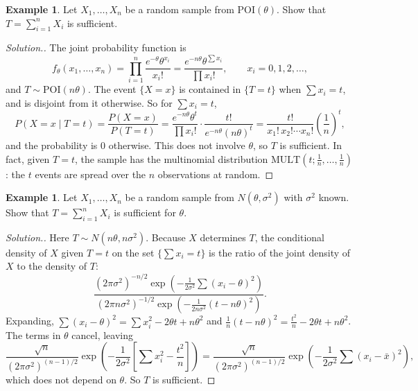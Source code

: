 \documentclass[12pt,a4paper]{report}
\theoremstyle{definition}
\newtheorem{exa}[thm]{Example}
\newenvironment{solution}
  {\renewcommand{\qedsymbol}{}\begin{proof}[\textit{Solution}.]}
  {\end{proof}}
\begin{document}
\begin{exa}
\label{ex:poissonsufficient}
Let $X_1, \dots, X_n$ be a random sample from $\text{POI}(\theta)$. Show that
$T = \sum_{i=1}^n X_i$ is sufficient.
\end{exa}

\begin{solution}
The joint probability function is
\[f_\theta(x_1, \dots, x_n) = \prod^n_{i = 1}\frac{e^{-\theta}\theta^{x_i}}{x_i!}
= \frac{e^{-n\theta}\theta^{\sum x_i}}{\prod x_i!},\qquad x_i = 0, 1, 2, \dots ,\]
and $T\sim\text{POI}(n\theta)$. The event $\{X = x\}$ is contained in
$\{T = t\}$ when $\sum x_i = t$, and is disjoint from it otherwise. So for
$\sum x_i = t$,
\[P(X = x\mid T = t) = \frac{P(X = x)}{P(T = t)}
= \frac{e^{-n\theta}\theta^{t}}{\prod x_i!}\cdot\frac{t!}{e^{-n\theta}(n\theta)^t}
= \frac{t!}{x_1!\,x_2!\cdots x_n!}\left(\frac1n\right)^t ,\]
and the probability is $0$ otherwise. This does not involve $\theta$, so $T$ is
sufficient. In fact, given $T = t$, the sample has the multinomial distribution
$\text{MULT}\left(t; \frac1n, \dots, \frac1n\right)$: the $t$ events are spread
over the $n$ observations at random.
\end{solution}

\begin{exa}
\label{ex:normalsufficient}
Let $X_1, \dots, X_n$ be a random sample from $N(\theta, \sigma^2)$ with $\sigma^2$
known. Show that $T = \sum_{i=1}^n X_i$ is sufficient for $\theta$.
\end{exa}

\begin{solution}
Here $T\sim N(n\theta, n\sigma^2)$. Because $X$ determines $T$, the conditional
density of $X$ given $T = t$ on the set $\{\sum x_i = t\}$ is the ratio of the joint
density of $X$ to the density of $T$:
\[\frac{(2\pi\sigma^2)^{-n/2}\exp\left(-\frac{1}{2\sigma^2}\sum(x_i - \theta)^2\right)}
{(2\pi n\sigma^2)^{-1/2}\exp\left(-\frac{1}{2n\sigma^2}(t - n\theta)^2\right)} .\]
Expanding, $\sum (x_i - \theta)^2 = \sum x_i^2 - 2\theta t + n\theta^2$ and
$\frac1n(t - n\theta)^2 = \frac{t^2}{n} - 2\theta t + n\theta^2$. The terms in
$\theta$ cancel, leaving
\[\frac{\sqrt n}{(2\pi\sigma^2)^{(n-1)/2}}\exp\left(-\frac{1}{2\sigma^2}\left[\sum x_i^2 - \frac{t^2}{n}\right]\right)
= \frac{\sqrt n}{(2\pi\sigma^2)^{(n-1)/2}}\exp\left(-\frac{1}{2\sigma^2}\sum (x_i - \bar x)^2\right),\]
which does not depend on $\theta$. So $T$ is sufficient.
\end{solution}
\end{document}
